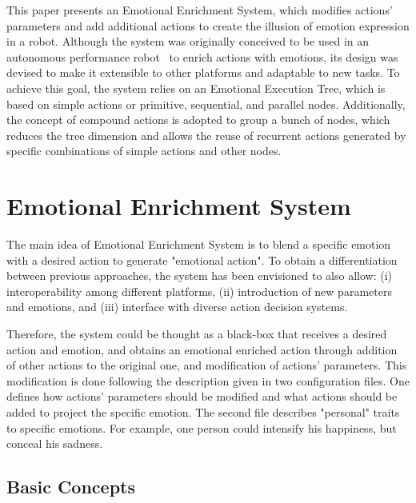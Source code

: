 \documentclass{sig-alternate-05-2015}
\begin{document}
This paper presents an Emotional Enrichment System, which modifies actions' parameters and add additional actions to create the illusion of emotion expression in a robot. Although the system was originally conceived to be used in an autonomous performance robot~\cite{angel2013} to enrich actions with emotions, its design was devised to make it extensible to other platforms and adaptable to new tasks. To achieve this goal, the system relies on an Emotional Execution Tree, which is based on simple actions or primitive, sequential, and parallel nodes. Additionally, the concept of compound actions is adopted to group a bunch of nodes, which reduces the tree dimension and allows the reuse of recurrent actions generated by specific combinations of simple actions and other nodes.

\section{Emotional Enrichment System}

The main idea of Emotional Enrichment System is to blend a specific emotion with a desired action to generate "emotional action". To obtain a differentiation between previous approaches, the system has been envisioned to also allow: (i) interoperability among different platforms, (ii) introduction of new parameters and emotions, and (iii) interface with diverse action decision systems.

Therefore, the system could be thought as a black-box that receives a desired action and emotion, and obtains an emotional enriched action through addition of other actions to the original one, and modification of actions' parameters. This modification is done following the description given in two configuration files. One defines how actions' parameters should be modified and what actions should be added to project the specific emotion. The second file describes "personal" traits to specific emotions. For example, one person could intensify his happiness, but conceal his sadness. 

\subsection{Basic Concepts}
\end{document}

